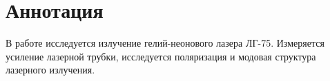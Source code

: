 \section*{Аннотация}

В работе исследуется излучение гелий-неонового 
лазера ЛГ-75. Измеряется усиление лазерной трубки, 
исследуется поляризация и модовая структура 
лазерного излучения.